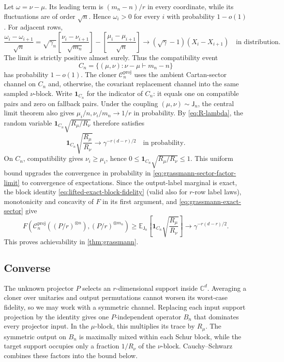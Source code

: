 \documentclass[11pt]{article}
\theoremstyle{remark}
\theoremstyle{plain}
\newcommand{\C}{\mathbb C}
\newcommand{\cC}{\mathcal C}
\newcommand{\ot}{\otimes}
\begin{document}
Let \(\omega=\nu-\mu\).  Its leading term is \((m_n-n)/r\) in every
coordinate, while its fluctuations are of order \(\sqrt n\).  Hence
\(\omega_i>0\) for every \(i\) with probability \(1-o(1)\).  For adjacent rows,
\[
  \frac{\omega_i-\omega_{i+1}}{\sqrt n}
  =\sqrt{\gamma_n}
    \left[\frac{\nu_i-\nu_{i+1}}{\sqrt{m_n}}\right]
    -\left[\frac{\mu_i-\mu_{i+1}}{\sqrt n}\right]
  \longrightarrow
    (\sqrt\gamma-1)(X_i-X_{i+1})
  \quad\text{in distribution}.
\]
The limit is strictly positive almost surely.  Thus the compatibility event
\[
  C_n=\{(\mu,\nu):\nu-\mu\vdash m_n-n\}
\]
has probability \(1-o(1)\).  The cloner \(\cC_n^{\mathrm{proj}}\) uses the
ambient Cartan-sector channel on \(C_n\) and, otherwise, the covariant
replacement channel into the same sampled \(\nu\)-block.
Write \(\mathbf1_{C_n}\) for the indicator of \(C_n\): it equals one on
compatible pairs and zero on fallback pairs.
Under the coupling \((\mu,\nu)\sim\mathsf J_n\), the central limit theorem also
gives \(\mu_i/n,\nu_i/m_n\to1/r\) in probability.  By
\eqref{eq:R-lambda}, the random variable
\(\mathbf1_{C_n}\sqrt{R_\mu/R_\nu}\) therefore satisfies
\begin{equation}\label{eq:grassmann-sector-factor-limit}
  \mathbf1_{C_n}\sqrt{\frac{R_\mu}{R_\nu}}
  \longrightarrow\gamma^{-r(d-r)/2}
  \quad\text{in probability}.
\end{equation}
On \(C_n\), compatibility gives \(\nu_i\ge\mu_i\), hence
\(0\le\mathbf1_{C_n}\sqrt{R_\mu/R_\nu}\le1\).  This uniform bound
upgrades the convergence in probability in
\eqref{eq:grassmann-sector-factor-limit} to convergence of expectations.
Since the output-label marginal is exact, the block identity
\eqref{eq:lifted-exact-block-fidelity} (valid also for \(r\)-row label
laws), monotonicity and concavity of \(F\) in its first argument, and
\eqref{eq:grassmann-exact-sector} give
\begin{equation}\label{eq:grassmann-achievability-limit}
  F\!\left(
    \cC_n^{\mathrm{proj}}((P/r)^{\ot n}),
    (P/r)^{\ot m_n}
  \right)
  \ge
  \mathbb E_{\mathsf J_n}\!\left[
    \mathbf1_{C_n}\sqrt{\frac{R_\mu}{R_\nu}}\right]
  \longrightarrow\gamma^{-r(d-r)/2}.
\end{equation}
This proves achievability in \cref{thm:grassmann}.

\subsection{Converse}

The unknown projector \(P\) selects an \(r\)-dimensional support inside
\(\C^d\).  Averaging a cloner over unitaries and output permutations
cannot worsen its worst-case fidelity, so we may work with a symmetric
channel.  Replacing each input support projection by the identity gives
one \(P\)-independent operator \(B_n\) that dominates every projector
input. In the \(\mu\)-block, this multiplies its trace by \(R_\mu\).
The symmetric output on \(B_n\) is maximally mixed within each Schur
block, while the target support occupies only a fraction \(1/R_\nu\) of
the \(\nu\)-block.  Cauchy--Schwarz combines these factors into the bound
below.
\end{document}
